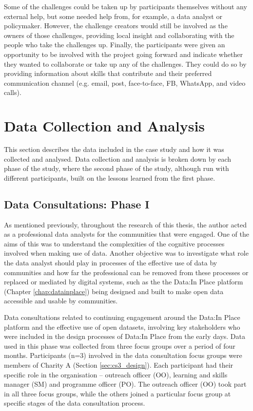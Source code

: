Some of the challenges could be taken up by participants themselves without any external help, but some needed help from, for example, a data analyst or policymaker. However, the challenge creators would still be involved as the owners of those challenges, providing local insight and collaborating with the people who take the challenges up. Finally, the participants were given an opportunity to be involved with the project going forward and indicate whether they wanted to collaborate or take up any of the challenges. They could do so by providing information about skills that contribute and their preferred communication channel (e.g. email, post, face-to-face, FB, WhatsApp, and video calls).

\section{Data Collection and Analysis}
This section describes the data included in the case study and how it was collected and analysed. Data collection and analysis is broken down by each phase of the study, where the second phase of the study, although run with different participants, built on the lessons learned from the first phase.

\subsection[Data Consultations]{Data Consultations: Phase I}
As mentioned previously, throughout the research of this thesis, the author acted as a professional data analysts for the communities that were engaged. One of the aims of this was to understand the complexities of the cognitive processes involved when making use of data. Another objective was to investigate what role the data analyst should play in processes of the effective use of data by communities and how far the professional can be removed from these processes or replaced or mediated by digital systems, such as the the Data:In Place platform (Chapter \ref{chap:datainplace}) being designed and built to make open data accessible and usable by communities.

Data consultations related to continuing engagement around the Data:In Place platform and the effective use of open datasets, involving key stakeholders who were included in the design processes of Data:In Place from the early days. Data used in this phase was collected from three focus groups over a period of four months. Participants (n=3) involved in the data consultation focus groups were members of Charity A (Section \ref{sec:cs3_design}). Each participant had their specific role in the organisation -- outreach officer (OO), learning and skills manager (SM) and programme officer (PO). The outreach officer (OO) took part in all three focus groups, while the others joined a particular focus group at specific stages of the data consultation process.

